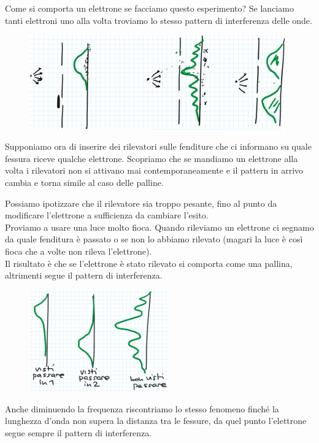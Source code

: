 \newpage
\noindent
Come si comporta un elettrone se facciamo questo esperimento? Se lanciamo tanti elettroni uno alla volta troviamo lo stesso pattern di interferenza delle onde.

\begin{figure}[!htb]
    \centering
    \includegraphics[width=11cm]{images/double_slit_elettroni.png}
\end{figure}

\bigskip

\noindent
Supponiamo ora di inserire dei rilevatori sulle fenditure che ci informano su quale fessura riceve qualche elettrone.
Scopriamo che se mandiamo un elettrone alla volta i rilevatori non si attivano mai contemporaneamente e il pattern in arrivo cambia e torna simile al caso delle palline.\bigskip


Possiamo ipotizzare che il rilevatore sia troppo pesante, fino al punto da modificare l'elettrone a sufficienza da cambiare l'esito.\\
Proviamo a usare una luce molto fioca. Quando rileviamo un elettrone ci segnamo da quale fenditura \`e passato o se non lo abbiamo rilevato (magari la luce \`e cos\`i fioca che a volte non rileva l'elettrone).\\
Il risultato \`e che se l'elettrone \`e stato rilevato si comporta come una pallina, altrimenti segue il pattern di interferenza.
\begin{figure}[!htb]
    \centering
    \includegraphics[width=6cm]{images/visti_passare_o_non_visti.png}
\end{figure}


Anche diminuendo la frequenza riscontriamo lo stesso fenomeno finch\'e la lunghezza d'onda non supera la distanza tra le fessure, da quel punto l'elettrone segue sempre il pattern di interferenza.\bigskip


